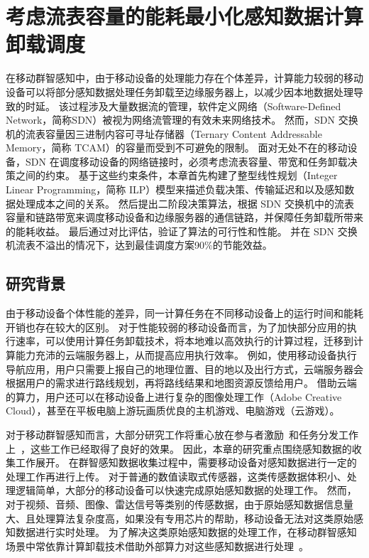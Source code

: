 \chapter{考虑流表容量的能耗最小化感知数据计算卸载调度}

在移动群智感知中，由于移动设备的处理能力存在个体差异，计算能力较弱的移动设备可以将部分感知数据处理任务卸载至边缘服务器上，以减少因本地数据处理导致的时延。
该过程涉及大量数据流的管理，软件定义网络（Software-Defined Network，简称SDN）被视为网络流管理的有效未来网络技术。
然而，SDN 交换机的流表容量因三进制内容可寻址存储器（Ternary Content Addressable Memory，简称 TCAM）的容量而受到不可避免的限制。
面对无处不在的移动设备，SDN 在调度移动设备的网络链接时，必须考虑流表容量、带宽和任务卸载决策之间的约束。
基于这些约束条件，本章首先构建了整型线性规划（Integer Linear Programming，简称 ILP）模型来描述负载决策、传输延迟和以及感知数据处理成本之间的关系。
然后提出二阶段决策算法，根据 SDN 交换机中的流表容量和链路带宽来调度移动设备和边缘服务器的通信链路，并保障任务卸载所带来的能耗收益。
最后通过对比评估，验证了算法的可行性和性能。
并在 SDN 交换机流表不溢出的情况下，达到最佳调度方案90\%的节能效益。

\section{研究背景}

由于移动设备个体性能的差异，同一计算任务在不同移动设备上的运行时间和能耗开销也存在较大的区别。
对于性能较弱的移动设备而言，为了加快部分应用的执行速率，可以使用计算任务卸载技术，将本地难以高效执行的计算过程，迁移到计算能力充沛的云端服务器上，从而提高应用执行效率。
例如，使用移动设备执行导航应用，用户只需要上报自己的地理位置、目的地以及出行方式，云端服务器会根据用户的需求进行路线规划，再将路线结果和地图资源反馈给用户。
借助云端的算力，用户还可以在移动设备上进行复杂的图像处理工作（Adobe Creative Cloud），甚至在平板电脑上游玩画质优良的主机游戏、电脑游戏（云游戏）。

对于移动群智感知而言，大部分研究工作将重心放在参与者激励~\cite{CNKI:JiaChaopeng, DBLP:journals/comsur/ZhangYSLTXM16, CNKI:WuMCSIncentive}和任务分发工作上~\cite{DBLP:conf/huc/LiuGWWYZ16, DBLP:conf/infocom/Xiao0HWL15, DBLP:conf/mass/LiLW15}，这些工作已经取得了良好的效果。
因此，本章的研究重点围绕感知数据的收集工作展开。
在群智感知数据收集过程中，需要移动设备对感知数据进行一定的处理工作再进行上传。
对于普通的数值读取式传感器，这类传感数据体积小、处理逻辑简单，大部分的移动设备可以快速完成原始感知数据的处理工作。
然而，对于视频、音频、图像、雷达信号等类别的传感数据，由于原始感知数据信息量大、且处理算法复杂度高，如果没有专用芯片的帮助，移动设备无法对这类原始感知数据进行实时处理。
为了解决这类原始感知数据的处理工作，在移动群智感知场景中常依靠计算卸载技术借助外部算力对这些感知数据进行处理~\cite{Lee:2013fj, Linthicum:2017vv, Kumar:2013dq}。

